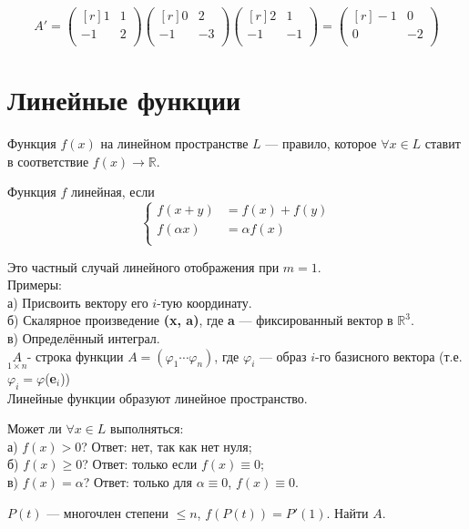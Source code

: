 $$
A'=
\begin{pmatrix*}[r]
 1 & 1\\
 -1 & 2\\
\end{pmatrix*}
\begin{pmatrix*}[r]
 0 & 2\\
 -1 & -3\\
\end{pmatrix*}
\begin{pmatrix*}[r]
 2 & 1\\
 -1 & -1\\
\end{pmatrix*}
=
\begin{pmatrix*}[r]
 -1 & 0\\
 0 & -2\\
\end{pmatrix*}
$$
\section{Линейные функции}
\begin{definition}
\textsf{Функция} $f(x)$ на линейном пространстве $L$ --- правило, которое $\forall x \in L$ ставит в соответствие $f(x) \rightarrow \mathbb{R} $.

Функция $f$ линейная, если 
$$
\left\{
\begin{array}{rl} %
f(x+y)&=f(x)+f(y)\\
f(\alpha x)&=\alpha f(x)\\
\end{array}
\right.
$$
\end{definition}


Это частный случай линейного отображения при $m=1$.\\
Примеры:\\ %
а) Присвоить вектору его $i$-тую координату.\\
б) Скалярное произведение \textbf{(\textbf{x}, \textbf{a})}, где \textbf{a} --- фиксированный вектор в $\mathbb{R}^3$.\\
в) Определённый интеграл.\\

$\underset{1 \times n}A$- строка функции $A=(\varphi_1 \cdots \varphi_n)$, где $\varphi_i$ --- образ $i$-го базисного вектора (т.е. $\varphi_i=\varphi$(\textbf{e$_i$}))\\

Линейные функции образуют линейное пространство.

\begin{prim}
Может ли $ \forall x \in L$ выполняться:\\
а) $f(x)>0$? Ответ: нет, так как нет нуля;\\
б) $f(x)\geq 0$? Ответ: только если $f(x)\equiv0$;\\
в) $f(x)=\alpha $? Ответ: только для $\alpha\equiv0$, $f(x)\equiv0$.\\
\end{prim}
\begin{prim}
$P(t)$ ---  многочлен степени $\leq n$, $f(P(t))=P'(1)$. Найти $A$.
\end{prim}\\

